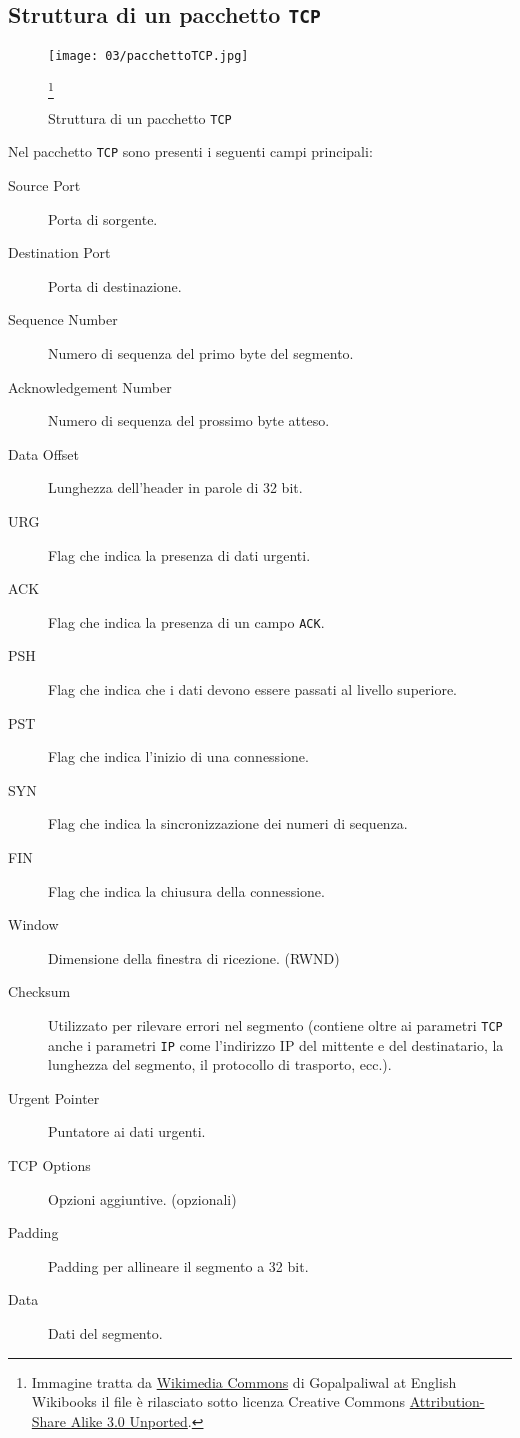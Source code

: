     \subsection{Struttura di un pacchetto \texttt{TCP}}
        \begin{figure}[H]
            \centering
            \texttt{[image: 03/pacchettoTCP.jpg]}
            \caption{Struttura di un pacchetto \texttt{TCP}} 
            \footnote{Immagine tratta da \href{https://commons.wikimedia.org/wiki/File:Ntwk_tcp_header.jpg}{Wikimedia Commons} di Gopalpaliwal at English Wikibooks il file è rilasciato sotto licenza Creative Commons \href{https://creativecommons.org/licenses/by-sa/3.0/deed.en}{Attribution-Share Alike 3.0 Unported}.}
        \end{figure}
        Nel pacchetto \texttt{TCP} sono presenti i seguenti campi principali:
        \begin{description}
            \item[Source Port] Porta di sorgente.
            \item[Destination Port] Porta di destinazione.
            \item[Sequence Number] Numero di sequenza del primo byte del segmento.
            \item[Acknowledgement Number] Numero di sequenza del prossimo byte atteso.
            \item[Data Offset] Lunghezza dell'header in parole di 32 bit.
            \item[URG] Flag che indica la presenza di dati urgenti.
            \item[ACK] Flag che indica la presenza di un campo \texttt{ACK}.
            \item[PSH] Flag che indica che i dati devono essere passati al livello superiore.
            \item[PST] Flag che indica l'inizio di una connessione.
            \item[SYN] Flag che indica la sincronizzazione dei numeri di sequenza.
            \item[FIN] Flag che indica la chiusura della connessione.
            \item[Window] Dimensione della finestra di ricezione. (RWND)
            \item[Checksum] Utilizzato per rilevare errori nel segmento (contiene oltre ai parametri \texttt{TCP} anche i parametri \texttt{IP} come l'indirizzo IP del mittente e del destinatario, la lunghezza del segmento, il protocollo di trasporto, ecc.).
            \item[Urgent Pointer] Puntatore ai dati urgenti.
            \item[TCP Options] Opzioni aggiuntive. (opzionali)
            \item[Padding] Padding per allineare il segmento a 32 bit.
            \item[Data] Dati del segmento.
        \end{description}
